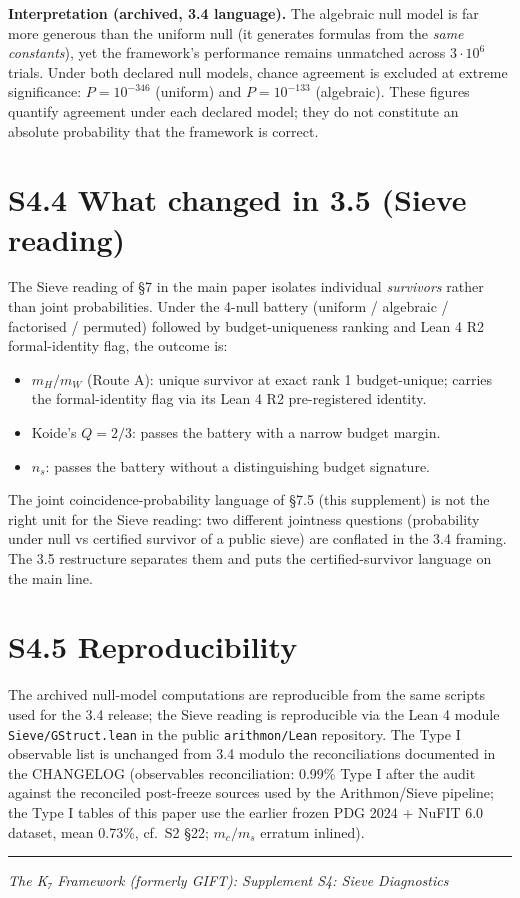 \documentclass[11pt,a4paper]{article}
\begin{document}
\textbf{Interpretation (archived, 3.4 language).} The algebraic null model is far more generous than the uniform null (it generates formulas from the \emph{same constants}), yet the framework's performance remains unmatched across \(3 \cdot 10^6\) trials. Under both declared null models, chance agreement is excluded at extreme significance: \(P = 10^{-346}\) (uniform) and \(P = 10^{-133}\) (algebraic). These figures quantify agreement under each declared model; they do not constitute an absolute probability that the framework is correct.

\section{S4.4 What changed in 3.5 (Sieve reading)}\label{s4.4-what-changed-in-3.5-sieve-reading}

The Sieve reading of §7 in the main paper isolates individual \emph{survivors} rather than joint probabilities. Under the 4-null battery (uniform / algebraic / factorised / permuted) followed by budget-uniqueness ranking and Lean 4 R2 formal-identity flag, the outcome is:

\begin{itemize}
\tightlist
\item
  \(m_H / m_W\) (Route A): unique survivor at exact rank 1 budget-unique; carries the formal-identity flag via its Lean 4 R2 pre-registered identity.
\item
  Koide's \(Q = 2/3\): passes the battery with a narrow budget margin.
\item
  \(n_s\): passes the battery without a distinguishing budget signature.
\end{itemize}

The joint coincidence-probability language of §7.5 (this supplement) is not the right unit for the Sieve reading: two different jointness questions (probability under null vs certified survivor of a public sieve) are conflated in the 3.4 framing. The 3.5 restructure separates them and puts the certified-survivor language on the main line.

\section{S4.5 Reproducibility}\label{s4.5-reproducibility}

The archived null-model computations are reproducible from the same scripts used for the 3.4 release; the Sieve reading is reproducible via the Lean 4 module \texttt{Sieve/\allowbreak{}GStruct.\allowbreak{}lean} in the public \texttt{arithmon/\allowbreak{}Lean} repository. The Type I observable list is unchanged from 3.4 modulo the reconciliations documented in the CHANGELOG (observables reconciliation: 0.99\% Type I after the audit against the reconciled post-freeze sources used by the Arithmon/Sieve pipeline; the Type I tables of this paper use the earlier frozen PDG 2024 + NuFIT 6.0 dataset, mean 0.73\%, cf.~S2 §22; \(m_c/m_s\) erratum inlined).

\begin{center}\rule{\linewidth}{0.5pt}\end{center}

\emph{The K₇ Framework (formerly GIFT): Supplement S4: Sieve Diagnostics}


\bigskip

\end{document}
